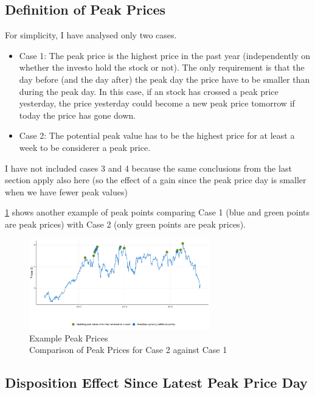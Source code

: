 \subsection{Definition of Peak Prices}
For simplicity, I have analysed only two cases. 

\begin{itemize}
	\item Case 1: The peak price is the highest price in the past year (independently on whether the investo hold the stock or not). The only requirement is that the day before (and the day after) the peak day the price have to be smaller than during the peak day. In this case, if an stock has crossed a peak price yesterday, the price yesterday could become a new peak price tomorrow if today the price has gone down.
	
	
	\item Case 2: The potential peak value has to be the highest price for at least a week to be considerer a peak price.

	
\end{itemize}

I have not included cases 3 and 4 because the same conclusions from the last section apply also here (so the effect of a gain since the peak price day is smaller when we have fewer peak values) 

\ref{fig:example_peak_window} shows another example of peak points comparing Case 1 (blue and green points are peak prices) with Case 2 (only green points are peak prices).

\begin{figure}[h]%
	\centering%
	\caption{Example Peak Prices  \\
		Comparison of Peak Prices for Case 2 against Case 1}%
	\label{fig:example_peak_window}%
		\includegraphics[width=0.7\textwidth]{figures/example_restriction_peaks.pdf}
	\fignote{  }
\end{figure}

\subsection{Disposition Effect Since Latest Peak Price Day}

